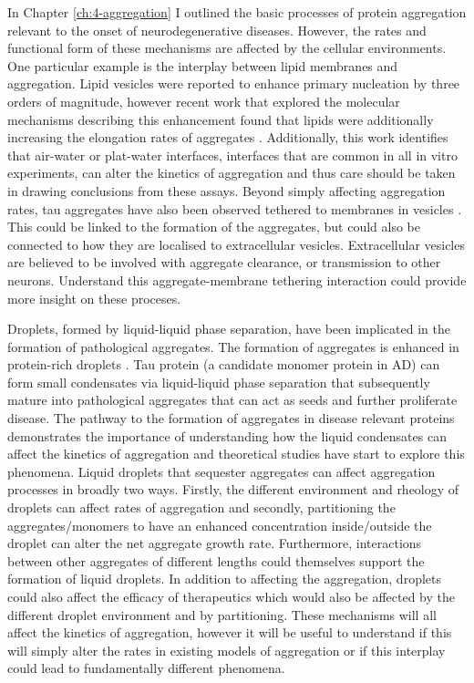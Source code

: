 In Chapter \ref{ch:4-aggregation} I outlined the basic processes of protein aggregation relevant to the onset of neurodegenerative diseases. However, the rates and functional form of these mechanisms are affected by the cellular environments. One particular example is the interplay between lipid membranes and aggregation. Lipid vesicles were reported to enhance primary nucleation by three orders of magnitude, \cite{galvagnion_lipid_2015} however recent work that explored the molecular mechanisms describing this enhancement found that lipids were additionally increasing the elongation rates of aggregates \cite{dear_molecular_2024-1}. Additionally, this work identifies that air-water or plat-water interfaces, interfaces that are common in all in vitro experiments, can alter the kinetics of aggregation and thus care should be taken in drawing conclusions from these assays. Beyond simply affecting aggregation rates, tau aggregates have also been observed tethered to membranes in vesicles \cite{fowler_tau_2023}. This could be linked to the formation of the aggregates, but could also be connected to how they are localised to extracellular vesicles. Extracellular vesicles are believed to be involved with aggregate clearance, or transmission to other neurons. Understand this aggregate-membrane tethering interaction could provide more insight on these proceses.

Droplets, formed by liquid-liquid phase separation, have been implicated in the formation of pathological aggregates. The formation of aggregates is enhanced in protein-rich droplets \cite{molliex_phase_2015}. Tau protein (a candidate monomer protein in AD) can form small condensates via liquid-liquid phase separation that subsequently mature into pathological aggregates that can act as seeds and further proliferate disease. \cite{soeda_intracellular_2024} The pathway to the formation of aggregates in disease relevant proteins demonstrates the importance of understanding how the liquid condensates can affect the kinetics of aggregation and theoretical studies have start to explore this phenomena. Liquid droplets that sequester aggregates can affect aggregation processes in broadly two ways. Firstly, the different environment and rheology of droplets can affect rates of aggregation \cite{ponisch_aggregation_2023} and secondly, partitioning the aggregates/monomers to have an enhanced concentration inside/outside the droplet can alter the net aggregate growth rate. \cite{weber_spatial_2019} Furthermore, interactions between other aggregates of different lengths could themselves support the formation of liquid droplets. \cite{bartolucci_interplay_2023} In addition to affecting the aggregation, droplets could also affect the efficacy of therapeutics which would also be affected by the different droplet environment and by partitioning. These mechanisms will all affect the kinetics of aggregation, however it will be useful to understand if this will simply alter the rates in existing models of aggregation or if this interplay could lead to fundamentally different phenomena. 

